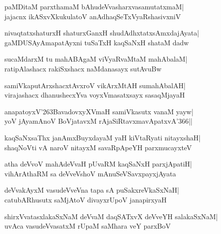 \documentclass[twoside,12pt,openright]{book}
\def\S{\char'263}
\newcounter{shloka}[chapter]
\begin{document}
\begin{shloka}%
paMDitaM parxthamaM bAhudeVvasharxvasamutatxmaM|\\
jajacnx ikASxvXkukulatoV anAdhaqSeTxVyaRshasivxniV
\end{shloka}

\begin{shloka}%
nivaqtatxshaturxH shaturxGanxH shudAdhxtatxsAmxdajAyata|\\
gaMDUSAyAmapatAyxni tuSaTxH kaqSaNxH shataM dadw
\end{shloka}

\begin{shloka}%
sucaMdarxM tu mahABAgaM viVyaRvaMtaM mahAbalaM|\\
ratipAlashacx rakiSxshacx naMdanasayx sutAvuBw
\end{shloka}

\begin{shloka}%
samiVkaputArxshacxtAvxroV vikArxMtAH sumahAbalAH|\\
virajashacx dhanushecxYva voyxVmasatxsayx sasaqMjayaH
\end{shloka}

\begin{shloka}%
anapatoyxV\S BavadovxyXVmaH samiVkasutx vanaM yayw|\\
yoV jAyamAnoV BoVjatavxM rAjaSiRtavxmavApatxvA\char'366||
\end{shloka}

\begin{shloka}%
kaqSaNxsaThx janAmxBuyxdayaM yaH kiVtaRyati nitayxshaH|\\
shaqNoVti vA naroV nitayxM savaRpApeYH parxmucayxteV
\end{shloka}

\begin{shloka}%
atha deVvoV mahAdeVvaH pUvaRM kaqSaNxH parxjApatiH|\\
vihArAthaRM sa deVveVshoV mAnuSeVSavxpayxjAyata
\end{shloka}

\begin{shloka}%
deVvakAyxM vasudeVveVna tapa sA puSakxreVkaSxNaH|\\
catubARhusutx saMjAtoV divayxrUpoV janapirxyaH
\end{shloka}

\begin{shloka}%
shirxVvatasxlakaSxNaM deVvaM daqSATxvX deVveYH salakaSxNaM|\\
uvAca vasudeVvasatxM rUpaM saMhara veY parxBoV
\end{shloka}
\end{document}
